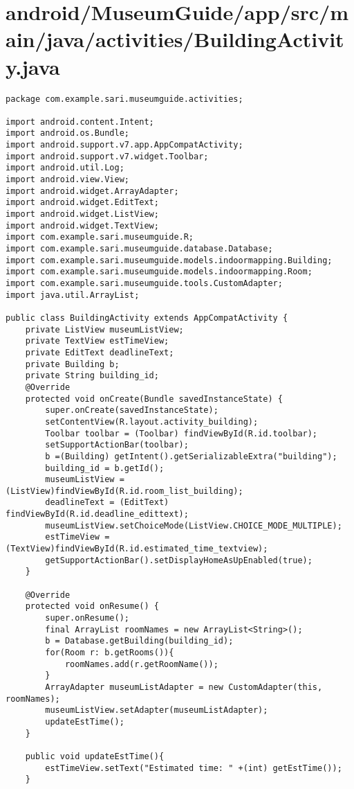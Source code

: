 \section{android/MuseumGuide/app/src/main/java/activities/BuildingActivity.java}
\begin{lstlisting}package com.example.sari.museumguide.activities;

import android.content.Intent;
import android.os.Bundle;
import android.support.v7.app.AppCompatActivity;
import android.support.v7.widget.Toolbar;
import android.util.Log;
import android.view.View;
import android.widget.ArrayAdapter;
import android.widget.EditText;
import android.widget.ListView;
import android.widget.TextView;
import com.example.sari.museumguide.R;
import com.example.sari.museumguide.database.Database;
import com.example.sari.museumguide.models.indoormapping.Building;
import com.example.sari.museumguide.models.indoormapping.Room;
import com.example.sari.museumguide.tools.CustomAdapter;
import java.util.ArrayList;

public class BuildingActivity extends AppCompatActivity {
    private ListView museumListView;
    private TextView estTimeView;
    private EditText deadlineText;
    private Building b;
    private String building_id;
    @Override
    protected void onCreate(Bundle savedInstanceState) {
        super.onCreate(savedInstanceState);
        setContentView(R.layout.activity_building);
        Toolbar toolbar = (Toolbar) findViewById(R.id.toolbar);
        setSupportActionBar(toolbar);
        b =(Building) getIntent().getSerializableExtra("building");
        building_id = b.getId();
        museumListView = (ListView)findViewById(R.id.room_list_building);
        deadlineText = (EditText) findViewById(R.id.deadline_edittext);
        museumListView.setChoiceMode(ListView.CHOICE_MODE_MULTIPLE);
        estTimeView = (TextView)findViewById(R.id.estimated_time_textview);
        getSupportActionBar().setDisplayHomeAsUpEnabled(true);
    }

    @Override
    protected void onResume() {
        super.onResume();
        final ArrayList roomNames = new ArrayList<String>();
        b = Database.getBuilding(building_id);
        for(Room r: b.getRooms()){
            roomNames.add(r.getRoomName());
        }
        ArrayAdapter museumListAdapter = new CustomAdapter(this, roomNames);
        museumListView.setAdapter(museumListAdapter);
        updateEstTime();
    }

    public void updateEstTime(){
        estTimeView.setText("Estimated time: " +(int) getEstTime());
    }


\end{lstlisting}
